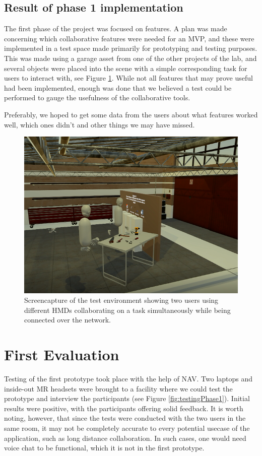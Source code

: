 \subsection{Result of phase 1 implementation}
The first phase of the project was focused on features. A plan was made concerning which collaborative features were needed for an MVP, and these were implemented in a test space made primarily for prototyping and testing purposes. This was made using a garage asset from one of the other projects of the lab, and several objects were placed into the scene with a simple corresponding task for users to interact with, see Figure \ref{fig:phase1Capture1}. While not all features that may prove useful had been implemented, enough was done that we believed a test could be performed to gauge the usefulness of the collaborative tools. 

Preferably, we hoped to get some data from the users about what features worked well, which ones didn't and other things we may have missed.


\begin{figure}
    \centering
    \captionsetup{width=.7\linewidth}
    \includegraphics[width=.7\textwidth]{./fig/phase_1/phase1_capture2.PNG}
    \caption{Screencapture of the test environment showing two users using different HMDs collaborating on a task simultaneously while being connected over the network.}
    \label{fig:phase1Capture1}
\end{figure}


\section{First Evaluation}
Testing of the first prototype took place with the help of NAV. Two laptops and inside-out MR headsets were brought to a facility where we could test the prototype and interview the participants (see Figure \ref{fig:testingPhase1}). Initial results were positive, with the participants offering solid feedback. It is worth noting, however, that since the tests were conducted with the two users in the same room, it may not be completely accurate to every potential usecase of the application, such as long distance collaboration. In such cases, one would need voice chat to be functional, which it is not in the first prototype.


